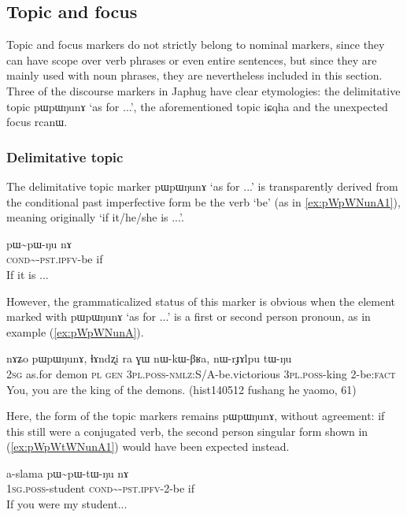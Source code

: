 \documentclass[oldfontcommands,oneside,a4paper,11pt]{article}
\newcommand{\ipa}[1]{\mbox{\phon #1}} %
\newcommand{\tld}{\textasciitilde{}}
\begin{document}
   \subsection{Topic and focus} \label{sec:topic}
Topic and focus markers do not strictly belong to nominal markers, since they can have scope over verb phrases or even entire sentences, but since they are mainly used with noun phrases, they are nevertheless included in this section. Three of the discourse markers in Japhug have clear etymologies: the delimitative topic \ipa{pɯpɯŋunɤ} `as for ...', the aforementioned topic \ipa{iɕqha} and the unexpected focus \ipa{rcanɯ}.

  \subsubsection{Delimitative topic}
The delimitative topic marker \ipa{pɯpɯŋunɤ} `as for ...' is transparently derived from the conditional past imperfective form be the verb `be' (as in \ref{ex:pWpWNunA1}), meaning originally `if it/he/she is ...'.

\begin{exe}
\ex \label{ex:pWpWNunA1}
\gll \ipa{pɯ\tld{}pɯ-ŋu} \ipa{nɤ} \\
\textsc{cond}\tld{}-\textsc{pst.ipfv}-be if \\
\glt If it is ...
\end{exe}

However, the grammaticalized status of this marker is obvious when the element marked with \ipa{pɯpɯŋunɤ} `as for ...' is a first or second person pronoun, as in example (\ref{ex:pWpWNunA}).

\begin{exe}
\ex \label{ex:pWpWNunA}
\gll \ipa{nɤʑo}	\ipa{pɯpɯŋunɤ,}	\ipa{ɬɤndʐi}	\ipa{ra}	\ipa{ɣɯ}	\ipa{nɯ-kɯ-βʁa,}	\ipa{nɯ-rɟɤlpu}	\ipa{tɯ-ŋu} \\
\textsc{2sg} as.for demon \textsc{pl} \textsc{gen} \textsc{3pl.poss}-\textsc{nmlz}:S/A-be.victorious \textsc{3pl.poss}-king 2-be:\textsc{fact} \\
\glt You, you are the king of the demons. (hist140512 fushang he yaomo, 61)
\end{exe}
Here, the form of the topic markers remains \ipa{pɯpɯŋunɤ}, without agreement: if this still were a conjugated verb, the second person singular form shown in (\ref{ex:pWpWtWNunA1}) would have been expected instead.

\begin{exe}
\ex \label{ex:pWpWtWNunA1}
\gll \ipa{a-slama} \ipa{pɯ\tld{}pɯ-tɯ-ŋu} \ipa{nɤ} \\
\textsc{1sg.poss}-student \textsc{cond}\tld{}-\textsc{pst.ipfv}-2-be if \\
\glt If you were my student...
\end{exe}
\end{document}
